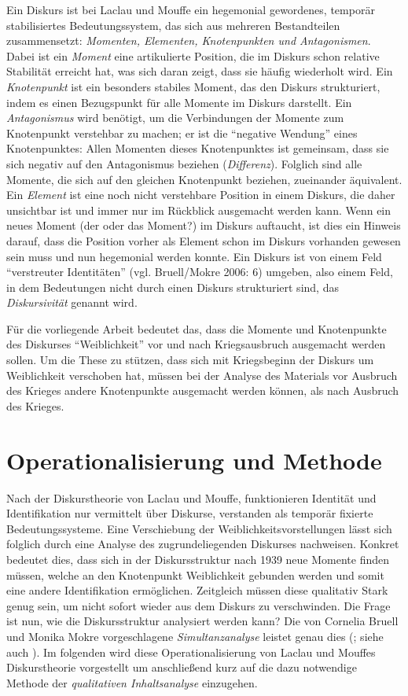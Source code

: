 \documentclass[12pt, titlepage=true, toc=bib]{scrartcl}
\begin{document}
Ein Diskurs ist bei Laclau und Mouffe ein hegemonial gewordenes, temporär stabilisiertes Bedeutungssystem, das sich aus mehreren Bestandteilen zusammensetzt: \textit{Momenten, Elementen, Knotenpunkten \textit{und }Antagonismen}. Dabei ist ein \textit{Moment} eine artikulierte Position, die im Diskurs schon relative Stabilität erreicht hat, was sich daran zeigt, dass sie häufig wiederholt wird. Ein \textit{Knotenpunkt} ist ein besonders stabiles Moment, das den Diskurs strukturiert, indem es einen Bezugspunkt für alle Momente im Diskurs darstellt. Ein \textit{Antagonismus} wird benötigt, um die Verbindungen der Momente zum Knotenpunkt verstehbar zu machen; er ist die "`negative Wendung"' eines Knotenpunktes: Allen Momenten dieses Knotenpunktes ist gemeinsam, dass sie sich negativ auf den Antagonismus beziehen (\textit{Differenz}). Folglich sind alle Momente, die sich auf den gleichen Knotenpunkt beziehen, zueinander äquivalent. Ein \textit{Element} ist eine noch nicht verstehbare Position in einem Diskurs, die daher unsichtbar ist und immer nur im Rückblick ausgemacht werden kann. Wenn ein neues Moment (der oder das Moment?) im Diskurs auftaucht, ist dies ein Hinweis darauf, dass die Position vorher als Element schon im Diskurs vorhanden gewesen sein muss und nun hegemonial werden konnte. Ein Diskurs ist von einem Feld "`verstreuter Identitäten"' (vgl. Bruell/Mokre 2006: 6) umgeben, also einem Feld, in dem Bedeutungen nicht durch einen Diskurs strukturiert sind, das \textit{Diskursivität} genannt wird. 

Für die vorliegende Arbeit bedeutet das, dass die Momente und Knotenpunkte des Diskurses "`Weiblichkeit"' vor und nach Kriegsausbruch ausgemacht werden sollen. Um die These zu stützen, dass sich mit Kriegsbeginn der Diskurs um Weiblichkeit verschoben hat, müssen bei der Analyse des Materials vor Ausbruch des Krieges andere Knotenpunkte ausgemacht werden können, als nach Ausbruch des Krieges. 



\section{Operationalisierung und Methode}

Nach der Diskurstheorie von Laclau und Mouffe, funktionieren Identität und Identifikation nur vermittelt über Diskurse, verstanden als temporär fixierte Bedeutungssysteme. Eine Verschiebung der Weiblichkeitsvorstellungen lässt sich folglich durch eine Analyse des zugrundeliegenden Diskurses nachweisen. Konkret bedeutet dies, dass sich in der Diskursstruktur nach 1939 neue Momente finden müssen, welche an den Knotenpunkt Weiblichkeit gebunden werden und somit eine andere Identifikation ermöglichen. Zeitgleich müssen diese qualitativ Stark genug sein, um nicht sofort wieder aus dem Diskurs zu verschwinden. Die Frage ist nun, wie die Diskursstruktur analysiert werden kann? Die von Cornelia Bruell und Monika Mokre vorgeschlagene \textit{Simultanzanalyse} leistet genau dies (\cite*{bruell_chancen_2006}; siehe auch \cite{nonhoff_kollektive_2007}). Im folgenden wird diese Operationalisierung von Laclau und Mouffes Diskurstheorie vorgestellt um anschließend kurz auf die dazu notwendige Methode der \textit{qualitativen Inhaltsanalyse} einzugehen.
\end{document}

